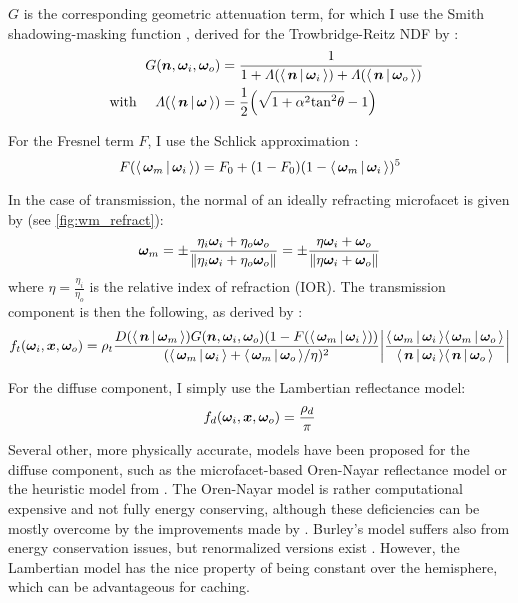 $G$ is the corresponding geometric attenuation term, for which I use the Smith shadowing-masking function , derived for the Trowbridge-Reitz NDF by \textcite{walter2007}:
\begin{equation}
    \begin{aligned}
    G(\n, \wi, \wo) &= \frac{1}{1 + \Lambda(\NdotL) + \Lambda(\NdotV)}\\
    \quad \text{with } \quad
    \Lambda(\NdotX) &= \frac{1}{2} \left( \sqrt{1 + \alpha^2 \mathrm{tan}^2 \theta} - 1 \right)
    \end{aligned}
\end{equation}

For the Fresnel term $F$, I use the Schlick approximation :
\begin{equation}
    F(\LdotH) = F_0 + (1 - F_0) (1 - \LdotH)^5
\end{equation}

In the case of transmission, the normal of an ideally refracting microfacet is given by (see \autoref{fig:wm_refract}):
\begin{equation}
    \bm{\omega}_m = \pm\frac{\eta_i {\bm{\omega}_i} + \eta_o {\bm{\omega}_o}}{\|\eta_i {\bm{\omega}_i} + \eta_o {\bm{\omega}_o}\|} = \pm\frac{\eta {\bm{\omega}_i} + {\bm{\omega}_o}}{\|\eta {\bm{\omega}_i} + {\bm{\omega}_o}\|}
\end{equation}
where $\eta = \frac{\eta_i}{\eta_o}$ is the relative index of refraction (IOR).
The transmission component is then the following, as derived by \textcite{walter2007}:
\begin{equation}
    f_t(\wi, \vec{x}, \wo) = \rho_t \frac{D(\NdotH) G(\n, \wi, \wo) (1 - F(\LdotH))}{(\LdotH + \VdotH / \eta)^2} \left|\frac{\LdotH \VdotH}{\NdotL \NdotV}\right|
\end{equation}

For the diffuse component, I simply use the Lambertian reflectance model:
\begin{equation}
    f_d({\bm{\omega}_i}, \bm{x}, {\bm{\omega}_o}) = \frac{\rho_d}{\pi}
\end{equation}
Several other, more physically accurate, models have been proposed for the diffuse component, such as the microfacet-based Oren-Nayar reflectance model  or the heuristic model from \textcite{burley2012}.
The Oren-Nayar model is rather computational expensive and not fully energy conserving, although these deficiencies can be mostly overcome by the improvements made by \textcite{fujii}.
Burley's model suffers also from energy conservation issues, but renormalized versions exist .
However, the Lambertian model has the nice property of being constant over the hemisphere, which can be advantageous for caching.

